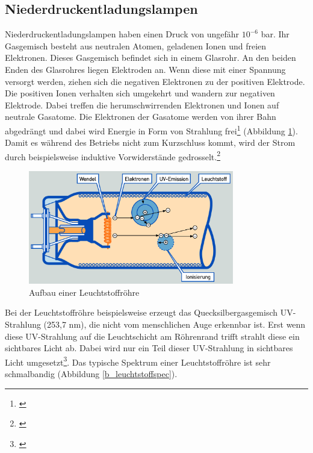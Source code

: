 \subsection{Niederdruckentladungslampen}
\noindent Niederdruckentladungslampen haben einen Druck von ungefähr $10^{-6}$ bar. Ihr Gasgemisch besteht aus neutralen Atomen, geladenen Ionen und freien Elektronen. Dieses Gasgemisch befindet sich in einem Glasrohr. An den beiden Enden des Glasrohres liegen Elektroden an. Wenn diese mit einer Spannung versorgt werden, ziehen sich die negativen Elektronen zu der positiven Elektrode. Die positiven Ionen verhalten sich umgekehrt und wandern zur negativen Elektrode. Dabei treffen die herumschwirrenden Elektronen und Ionen auf neutrale Gasatome. Die Elektronen der Gasatome werden von ihrer Bahn abgedrängt und dabei wird Energie in Form von Strahlung frei\footnote{\cite[93]{ris}} (Abbildung \ref{b_leuchtstoff}). Damit es während des Betriebs nicht zum Kurzschluss kommt, wird der Strom durch beispielsweise induktive Vorwiderstände gedrosselt.\footnote{\cite[141]{mueller}}\\


\begin{figure}[htp]     %
\centering
\includegraphics[width=0.8\textwidth]{bilder/leuchtstoff} 
\caption {Aufbau einer Leuchtstoffröhre\protect\footnotemark}\label{b_leuchtstoff}
\end{figure}

\noindent Bei der Leuchtstoffröhre beispielsweise erzeugt das Quecksilbergasgemisch UV-Strahlung (253,7 nm), die nicht vom menschlichen Auge erkennbar ist. Erst wenn diese UV-Strahlung auf die Leuchtschicht am Röhrenrand trifft strahlt diese ein sichtbares Licht ab. Dabei wird nur ein Teil dieser UV-Strahlung in sichtbares Licht umgesetzt\footnote{\cite[96]{ris}}. Das typische Spektrum einer Leuchtstoffröhre ist sehr schmalbandig (Abbildung \ref{b_leuchtstoffspec}).

